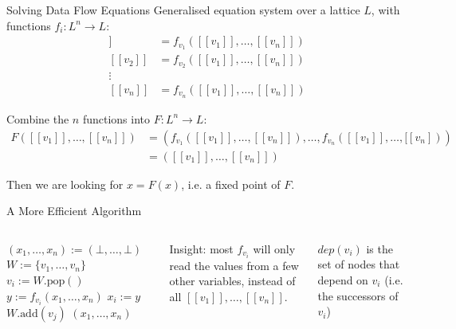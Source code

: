 \documentclass[aspectratio=169,xcolor=dvipsnames]{beamer}
\begin{document}

\begin{frame}{Solving Data Flow Equations}
	Generalised equation system over a lattice $L$, with functions $f_i: L^n
		\rightarrow L$:
	\begin{align*}
		[[v_1]] & = f_{v_1}([[v_1]], \ldots, [[v_n]]) \\
		[[v_2]] & = f_{v_2}([[v_1]], \ldots, [[v_n]]) \\
		\vdots                                        \\
		[[v_n]] & = f_{v_n}([[v_1]], \ldots, [[v_n]])
	\end{align*}

	Combine the $n$ functions into $F: L^n \rightarrow L$:
	\begin{align*}
		F([[v_1]], \ldots, [[v_n]]) & = (f_{v_1}([[v_1]], \ldots, [[v_n]]), \ldots, f_{v_n}([[v_1]], \ldots, [[v_n])) \\
		                            & = ([[v_1]], \ldots, [[v_n]])
	\end{align*}

	Then we are looking for $x = F(x)$, i.e. a fixed point of $F$.
\end{frame}


\begin{frame}[fragile]{A More Efficient Algorithm}
	\begin{columns}[c] %


		\begin{algorithm}[H]
			\footnotesize
			\begin{algorithmic}[1]
				\State $(x_1, \ldots, x_n) := (\bot, \ldots, \bot)$
				\State $W := \{v_1, \ldots, v_n\}$
				\State $v_i := W.\text{pop}()$
				\State $y := f_{v_i}(x_1, \ldots, x_n)$
				\State $x_i := y$
				\State $W.\text{add}(v_j)$
				\EndFor
				\EndIf
				\EndWhile
				\State \Return $(x_1, \ldots, x_n)$
				\EndProcedure
			\end{algorithmic}
			\caption{Simple Worklist Algorithm}
		\end{algorithm}


		Insight: most $f_{v_i}$ will only read the values from a few other variables,
		instead of all $[[v_1]], \ldots, [[v_n]]$.

		\bigskip

		$dep(v_i)$ is the set of nodes that depend on $v_i$ (i.e. the successors of $v_i$)
	\end{columns}
\end{frame}
\end{document}
